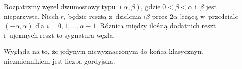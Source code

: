 \begin{proposition}
\label{prp:tangle_signature}
    Rozpatrzmy węzeł dwumostowy typu $(\alpha, \beta)$, gdzie $0 < \beta < \alpha$ i~$\beta$ jest nieparzyste.
    Niech $r_i$ będzie resztą z~dzielenia $i\beta$ przez $2\alpha$ leżącą w~przedziale $(-\alpha, \alpha)$ dla $i = 0, 1, \ldots, \alpha - 1$.
    Różnica między ilością dodatnich reszt i~ujemnych reszt to sygnatura węzła.
\end{proposition}

Wygląda na to, że jedynym niewyznaczonym do końca klasycznym niezmiennikiem jest liczba gordyjska.

